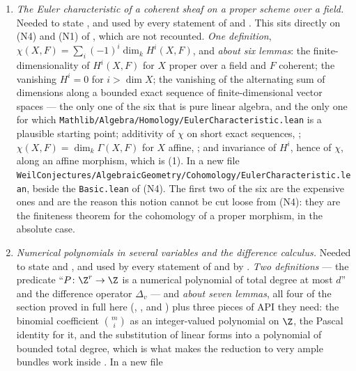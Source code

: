 \begin{enumerate}
  \item[(N8)] \emph{The Euler characteristic of a coherent sheaf on a proper
  scheme over a field.}  Needed to state , and used by
  every statement of  and .
  This sits directly on (N4) and (N1) of , which are not
  recounted.  \emph{One definition}, $\chi(X,F)=\sum_i(-1)^i\dim_kH^i(X,F)$,
  and \emph{about six lemmas}: the finite-dimensionality of $H^i(X,F)$ for $X$
  proper over a field and $F$ coherent; the vanishing $H^i=0$ for
  $i>\dim X$; the vanishing of the alternating sum of dimensions along a
  bounded exact sequence of finite-dimensional vector spaces --- the only one
  of the six that is pure linear algebra, and the only one for which
  \texttt{Mathlib/Algebra/Homology/EulerCharacteristic.lean} is a plausible
  starting point; additivity of $\chi$ on short exact sequences,
  ; $\chi(X,F)=\dim_k\Gamma(X,F)$ for $X$ affine,
  ; and invariance of $H^i$, hence of $\chi$, along
  an affine morphism, which is (1).  In a
  new file
  \texttt{WeilConjectures/AlgebraicGeometry/Cohomology/EulerCharacteristic.lean},
  beside the \texttt{Basic.lean} of (N4).  The first two of the six are the
  expensive ones and are the reason this notion cannot be cut loose from
  (N4): they are the finiteness theorem for the cohomology of a proper
  morphism, in the absolute case.
  \item[(N9)] \emph{Numerical polynomials in several variables and the
  difference calculus.}  Needed to state  and
  , and used by every statement of
   and by .
  \emph{Two definitions} --- the predicate ``$P\colon\Z^r\to\Z$ is a numerical
  polynomial of total degree at most $d$'' and the difference operator
  $\Delta_v$ --- and \emph{about seven lemmas}, all four of the section proved
  in full here (,
  ,
   and
  ) plus three pieces of API they need: the
  binomial coefficient $\binom{m}{i}$ as an integer-valued polynomial on $\Z$,
  the Pascal identity for it, and the substitution of linear forms into a
  polynomial of bounded total degree, which is what makes the reduction to
  very ample bundles work inside .  In a new file

\end{enumerate}
